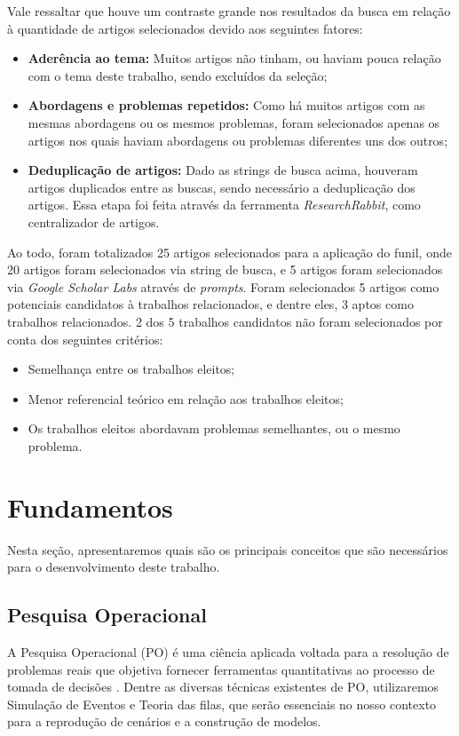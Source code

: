 \documentclass[
    12pt,                %
    openright,           %
    oneside,             %
    a4paper,             %
    english,             %
    brazil               %
]{abntex2}
\begin{document}
Vale ressaltar que houve um contraste grande nos resultados da busca em relação à quantidade de artigos selecionados devido aos seguintes fatores:
\begin{itemize}
	\item \textbf{Aderência ao tema:} Muitos artigos não tinham, ou haviam pouca relação com o tema deste trabalho, sendo excluídos da seleção;
	\item \textbf{Abordagens e problemas repetidos:} Como há muitos artigos com as mesmas abordagens ou os mesmos problemas, foram selecionados apenas os artigos nos quais haviam abordagens ou problemas diferentes uns dos outros;
	\item \textbf{Deduplicação de artigos:} Dado as strings de busca acima, houveram artigos duplicados entre as buscas, sendo necessário a deduplicação dos artigos. Essa etapa foi feita através da ferramenta \textit{ResearchRabbit}, como centralizador de artigos.
\end{itemize}

Ao todo, foram totalizados 25 artigos selecionados para a aplicação do funil, onde 20 artigos foram selecionados via string de busca, e 5 artigos foram selecionados via \textit{Google Scholar Labs} através de \textit{prompts}. Foram selecionados 5 artigos como potenciais candidatos à trabalhos relacionados, e dentre eles, 3 aptos como trabalhos relacionados. 2 dos 5 trabalhos candidatos não foram selecionados por conta dos seguintes critérios:
\begin{itemize}
	\item Semelhança entre os trabalhos eleitos;
	\item Menor referencial teórico em relação aos trabalhos eleitos;
	\item Os trabalhos eleitos abordavam problemas semelhantes, ou o mesmo problema.
\end{itemize}

\section{Fundamentos}

Nesta seção, apresentaremos quais são os principais conceitos que são necessários para o desenvolvimento deste trabalho.

\subsection{Pesquisa Operacional}
A Pesquisa Operacional (PO) é uma ciência aplicada voltada para a resolução de problemas reais que objetiva fornecer ferramentas quantitativas ao processo de tomada de decisões \cite{Rodriguez2009}. Dentre as diversas técnicas existentes de PO, utilizaremos Simulação de Eventos e Teoria das filas, que serão essenciais no nosso contexto para a reprodução de cenários e a construção de modelos.
\end{document}
